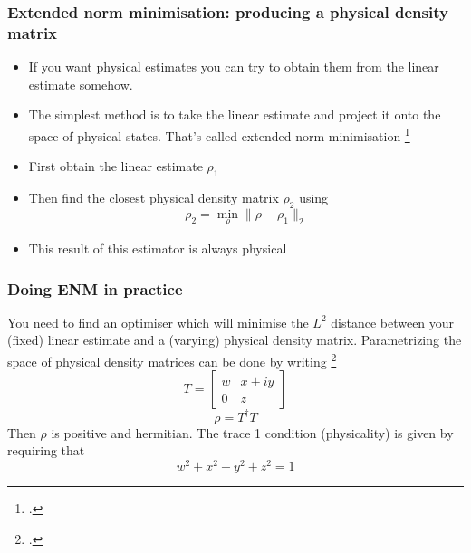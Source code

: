 \documentclass{beamer}
\begin{document}
\begin{frame}
  \frametitle{Extended norm minimisation: producing a physical density matrix}
  \begin{itemize}
  \item If you want physical estimates you can try to obtain them from the linear estimate somehow.
  \item The simplest method is to take the linear estimate and project it onto the space of physical states. That's called extended norm minimisation \footcite{PhysRevLett.111.160406}
  \item First obtain the linear estimate $\rho_1$
  \item Then find the closest physical density matrix $\rho_2$ using $$\rho_2 = \min_{\rho} \lVert \rho - \rho_1\rVert_2$$
  \item This result of this estimator is always physical
  \end{itemize}
\end{frame}

\begin{frame}
  \frametitle{Doing ENM in practice}
  You need to find an optimiser which will minimise the $L^2$ distance between your (fixed) linear estimate and a (varying) physical density matrix. Parametrizing the space of physical density matrices can be done by writing \footcite{banaszek1999maximum}
  \begin{equation}
    T = \begin{bmatrix}w&x+iy\\0&z\end{bmatrix}
  \end{equation}
  \begin{equation}
    \rho = T^\dagger T
  \end{equation}
  Then $\rho$ is positive and hermitian. The trace 1 condition (physicality) is given by requiring that
  \begin{equation}
    w^2+x^2+y^2+z^2=1
  \end{equation}
\end{frame}
\end{document}

